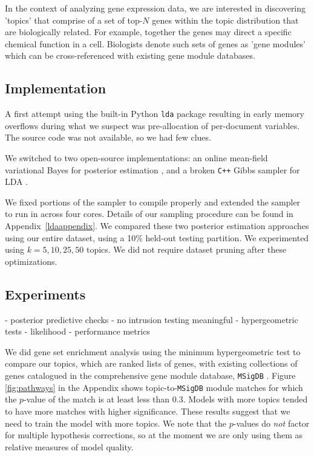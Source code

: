 \documentclass{article}
\begin{document}
In the context of analyzing gene expression data, we are interested in discovering 'topics' that comprise of a set of top-$N$ genes within the topic distribution that are biologically related. For example, together the genes may direct a specific chemical function in a cell. Biologists denote such sets of genes as 'gene modules' which can be cross-referenced with existing gene module databases.

\subsection{Implementation} 
A first attempt using the built-in Python \texttt{lda} package resulting in early memory overflows during what we suspect was pre-allocation of per-document variables. The source code was not available, so we had few clues.

We switched to two open-source implementations: an online mean-field variational Bayes for posterior estimation \cite{ovb}, and a broken \texttt{C++} Gibbs sampler for LDA \cite{plda}. 

\nocite{online}

We fixed portions of the sampler to compile properly and extended the sampler to run in across four cores. Details of our sampling procedure can be found in Appendix~\ref{ldaappendix}. We compared these two posterior estimation approaches using our entire dataset, using a 10\% held-out testing partition. We experimented using $k=5, 10, 25, 50$ topics. We did not require dataset pruning after these optimizations.

\subsection{Experiments} 
- posterior predictive checks
- no intrusion testing meaningful
- hypergeometric tests
- likelihood
- performance metrics

We did gene set enrichment analysis using the minimum hypergeometric test \cite{hg} to compare our topics, which are ranked lists of genes, with existing collections of genes catalogued in the comprehensive gene module database, \texttt{MSigDB} \cite{msigdb}. Figure \ref{fig:pathways} in the Appendix shows topic-to-\texttt{MSigDB} module matches for which the $p$-value of the match is at least less than 0.3. Models with more topics tended to have more matches with higher significance. These results suggest that we need to train the model with more topics. We note that the $p$-values do \textit{not} factor for multiple hypothesis corrections, so at the moment we are only using them as relative measures of model quality.
\end{document}
